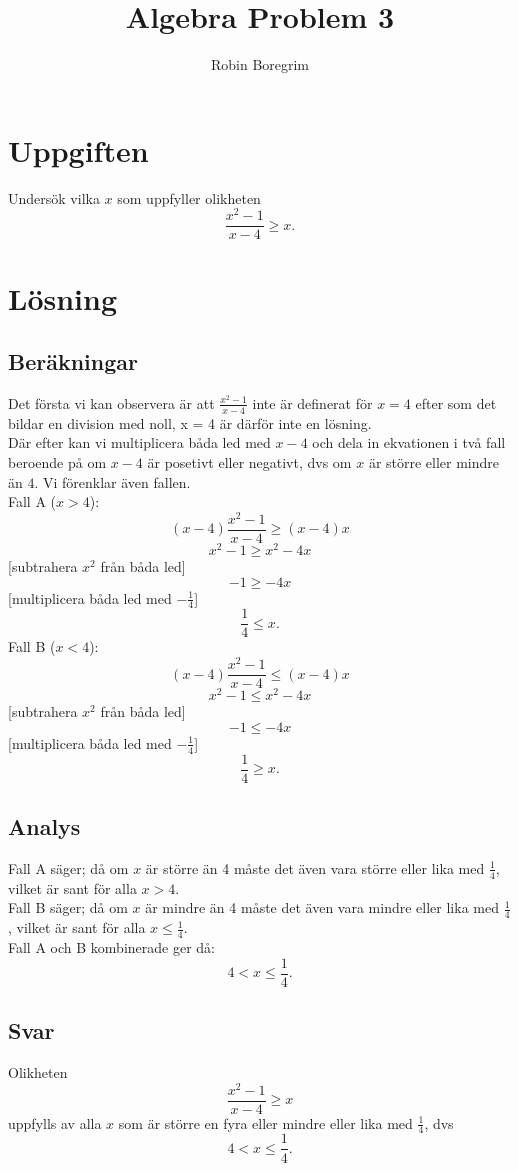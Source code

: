 \documentclass[11pt]{article}
\begin{document}
\title{Algebra Problem 3}
\author{Robin Boregrim}

\maketitle
\renewcommand{\contentsname}{Innehållsförteckning}
\tableofcontents
\newpage
\section{Uppgiften}
Undersök vilka $x$ som uppfyller olikheten $$\frac{x^2-1}{x-4} \geq x.$$
\section{Lösning}
\subsection{Beräkningar}
Det första vi kan observera är att $\frac{x^2-1}{x-4}$ inte är definerat för $x = 4$ efter som det bildar en division med noll, x = 4 är därför inte en lösning.\\
Där efter kan vi multiplicera båda led med $x-4$ och dela in ekvationen i två fall beroende på om $x-4$ är posetivt eller negativt, dvs om $x$ är större eller mindre än $4$. Vi förenklar även fallen.\\
Fall A ($x > 4$):
$$(x-4)\frac{x^2-1}{x-4} \geq (x-4)x$$
$$x^2-1 \geq x^2 - 4x$$
[subtrahera $x^2$ från båda led]
$$-1 \geq - 4x$$
[multiplicera båda led med $-\frac{1}{4}$]
$$\frac{1}{4} \leq x.$$
Fall B ($x < 4$):
$$(x-4)\frac{x^2-1}{x-4} \leq (x-4)x$$
$$x^2-1 \leq x^2 - 4x$$
[subtrahera $x^2$ från båda led]
$$-1 \leq - 4x$$
[multiplicera båda led med $-\frac{1}{4}$]
$$\frac{1}{4} \geq x.$$
\newpage
\subsection{Analys}
Fall A säger; då om $x$ är större än 4 måste det även vara större eller lika med $\frac{1}{4}$, vilket är sant för alla $x > 4$.\\
Fall B säger; då om $x$ är mindre än 4 måste det även vara mindre eller lika med $\frac{1}{4}$, vilket är sant för alla $x \leq \frac{1}{4}$.\\
Fall A och B kombinerade ger då:
$$4 < x \leq \frac{1}{4}.$$
\subsection{Svar}
Olikheten $$\frac{x^2-1}{x-4} \geq x$$
uppfylls av alla $x$ som är större en fyra eller mindre eller lika med $\frac{1}{4}$, dvs
$$4 < x \leq \frac{1}{4}.$$
\end{document}
